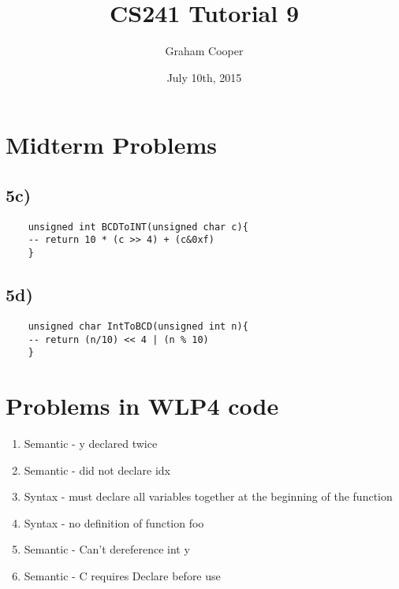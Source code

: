 \documentclass[12pt]{article}
\title{\vspace{-15ex}CS241 Tutorial 9\vspace{-1ex}}
\date{July 10th, 2015}
\author{Graham Cooper}
\begin{document}
	\maketitle
	\section*{Midterm Problems}
	\subsection*{5c)}
	\begin{verbatim}
	unsigned int BCDToINT(unsigned char c){
	-- return 10 * (c >> 4) + (c&0xf)
	}
	\end{verbatim}
	
	\subsection*{5d)}
	\begin{verbatim}
	unsigned char IntToBCD(unsigned int n){
	-- return (n/10) << 4 | (n % 10)	
	}
	\end{verbatim}
	
	\section*{Problems in WLP4 code}
	\begin{enumerate}
		\item Semantic - y declared twice
		\item Semantic - did not declare idx
		\item Syntax - must declare all variables together at the beginning of the function
		\item Syntax - no definition of function foo
		\item Semantic - Can't dereference int y
		\item Semantic - C requires Declare before use
	\end{enumerate}
	
\end{document}
